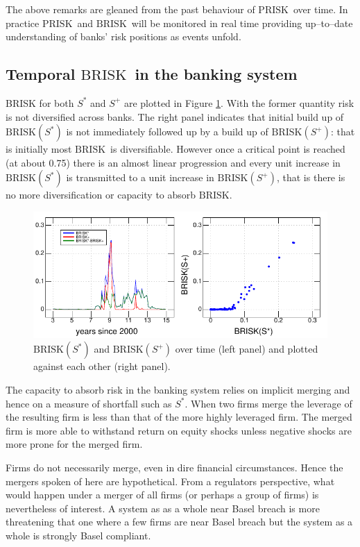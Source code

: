 \documentclass[authoryear]{elsarticle}
\newcommand{\fref}[1]{Figure \ref{#1}}
\newcommand{\br}{\ensuremath{\mathrm{BRISK}}}
\newcommand{\pr}{\ensuremath{\mathrm{PRISK}}}
\begin{document}
The above remarks are gleaned from the past behaviour of \pr\ over time.   In practice \pr\ and  \br\  will be monitored in real time providing up--to--date understanding of banks' risk positions as events unfold.


\subsection{Temporal \br\  in the banking system}\label{Baggregate}

BRISK for both $S^*$ and $S^+$ are plotted in \fref{muqsB}.  With the former quantity risk is not diversified across banks.   The right panel indicates that initial build up of  $\br(S^*)$ is not immediately followed up by a build up of $\br(S^+)$: that is initially most \br\ is diversifiable.   However once a critical point is reached (at about 0.75) there is an almost linear progression and every unit increase in $\br(S^*)$ is transmitted to a unit increase in $\br(S^+)$, that is there is no more diversification or capacity to absorb \br.

\begin{figure}[htbp]
\begin{center}
\includegraphics[width=12cm]{figures/muqsB.pdf}
\caption{$\br(S^*)$ and $\br(S^+)$ over time (left panel) and plotted against each other (right panel).}\label{muqsB}
\end{center}
\end{figure}

The capacity to absorb risk in the banking system relies on implicit merging and hence on a measure of shortfall such as $S^*$.    When two firms merge the leverage of the resulting firm is less than that of the more highly leveraged firm.   The merged firm is more able to withstand return on equity shocks  unless negative shocks are more prone for the merged firm.

Firms do not necessarily merge, even in dire financial circumstances.   Hence the mergers spoken of here are hypothetical.   From a regulators perspective, what would happen under a merger of all firms (or perhaps a group of firms) is nevertheless of interest.   A system as as a whole near Basel breach is more threatening that one where a few firms are near Basel breach but the system as a whole is strongly Basel compliant.
\end{document}
